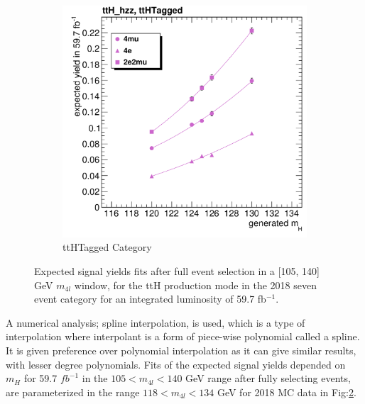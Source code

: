 \begin{figure}[h]
\begin{subfigure}[b]{0.3\textwidth}
         \includegraphics[width=\textwidth]{images/cFits_ttH_hzz_ttHTagged_.png}
         \caption{ttHTagged Category}
         \label{fig:five over x}
     \end{subfigure}
        \caption{Expected signal yields fits after full event
selection in a [105, 140] GeV $m_{4l}$ window, for the ttH production mode in the 2018 seven event category for an integrated luminosity of 59.7 fb$^{-1}$.}
        \label{fig:yield}
\end{figure}
A numerical analysis; spline interpolation, is used, which is a type of interpolation where interpolant is a form of piece-wise polynomial called a spline. It is given preference over polynomial interpolation as it can give similar results, with lesser degree polynomials.
Fits of the expected signal yields depended on $m_H$ for 59.7 $fb^{-1}$ in the $105 < m_{4l} < 140$ GeV range after fully selecting events, are parameterized in the range $118 < m_{4l} < 134$ GeV for 2018 MC data in Fig:\ref{fig:yield}.

